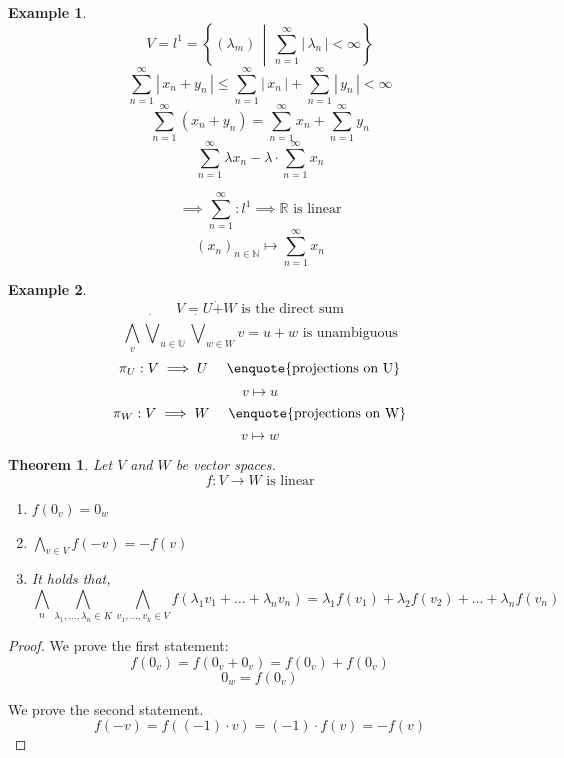 \documentclass[a4paper,landscape,twocolumn]{article}
\newcommand\abs[1]{|\,#1\,|}
\newcommand\setdef[2]{\left\{#1\,\middle|\,#2\right\}}
\newtheorem{theorem}{Theorem}[section]
\newtheorem{ex}{Example}[section]
\begin{document}
\begin{ex}
  \[ V = l^1 = \setdef{(\lambda_m)}{\sum_{n=1}^\infty \abs{\lambda_n} < \infty} \]
  \[ \sum_{n=1}^\infty \abs{x_n + y_n} \leq \sum_{n=1}^\infty \abs{x_n} + \sum_{n=1}^\infty \abs{y_n} < \infty \]
  \[ \sum_{n=1}^\infty (x_n + y_n) = \sum_{n=1}^\infty x_n + \sum_{n=1}^\infty y_n \]
  \[ \sum_{n=1}^\infty \lambda x_n - \lambda \cdot \sum_{n=1}^\infty x_n \]

  \[ \implies \sum_{n=1}^\infty: l^1 \implies \mathbb R \text{ is linear} \]
  \[ (x_n)_{n\in\mathbb N} \mapsto \sum_{n=1}^\infty x_n \]
\end{ex}

\begin{ex}
  \[ V = U \dot{+} W \text{ is the direct sum} \]
  \[ \bigwedge_v \dot\bigvee_{u \in \mathbb U} \dot\bigvee_{w \in W} v = u + w \text{ is unambiguous} \]
  \[ \pi_U: V \implies U \quad\text{ \enquote{projections on U}} \]
  \[ v \mapsto u \]
  \[ \pi_W: V \implies W \quad\text{ \enquote{projections on W}} \]
  \[ v \mapsto w \]
\end{ex}

\begin{theorem}
  Let $V$ and $W$ be vector spaces.
  \[ f: V \rightarrow W \text{ is linear} \]
  \begin{enumerate}
    \item $f(0_v) = 0_w$
    \item $\bigwedge_{v \in V} f(-v) = -f(v)$
    \item It holds that,
      \[
        \bigwedge_{n} \bigwedge_{\lambda_1, \dots, \lambda_n \in K} \bigwedge_{v_1, \dots, v_k \in V}
        f(\lambda_1 v_1 + \dots + \lambda_n v_n) = \lambda_1 f(v_1) + \lambda_2 f(v_2) + \dots + \lambda_n f(v_n)
      \]
  \end{enumerate}
\end{theorem}
\begin{proof}
  We prove the first statement:
  \[ f(0_v) = f(0_v + 0_v) = f(0_v) + f(0_v) \]
  \[ 0_w = f(0_v) \]

  We prove the second statement.
  \[ f(-v) = f((-1) \cdot v) = (-1) \cdot f(v) = -f(v) \]
\end{proof}
\end{document}
